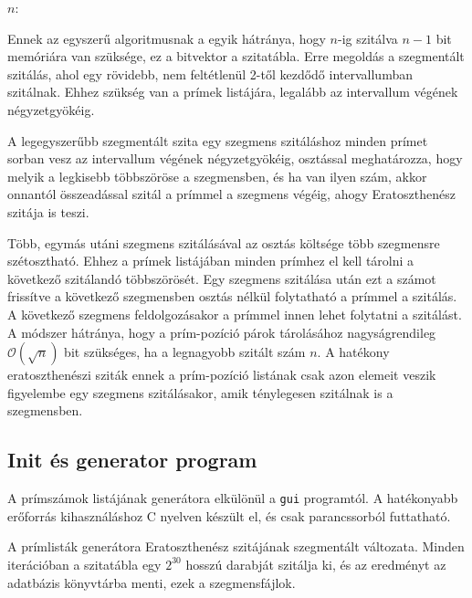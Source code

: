 \begin{algorithmic}[1]
\State $n$: 
\State {}
			\State {}
		\EndFor
	\EndIf
\EndFor
\end{algorithmic}

Ennek az egyszerű algoritmusnak a egyik hátránya, hogy $n$-ig szitálva $n-1$ bit memóriára van szüksége, ez a bitvektor a szitatábla.
Erre megoldás a szegmentált szitálás, ahol egy rövidebb, nem feltétlenül 2-től kezdődő intervallumban szitálnak.
Ehhez szükség van a prímek listájára, legalább az intervallum végének négyzetgyökéig.

A legegyszerűbb szegmentált szita egy szegmens szitáláshoz minden prímet sorban vesz az intervallum végének négyzetgyökéig, osztással meghatározza, hogy melyik a legkisebb többszöröse a szegmensben, és ha van ilyen szám, akkor onnantól összeadással szitál a prímmel a szegmens végéig, ahogy Eratoszthenész szitája is teszi.

Több, egymás utáni szegmens szitálásával az osztás költsége több szegmensre szétosztható.
Ehhez a prímek listájában minden prímhez el kell tárolni a következő szitálandó többszörösét.
Egy szegmens szitálása után ezt a számot frissítve a következő szegmensben osztás nélkül folytatható a prímmel a szitálás.
A következő szegmens feldolgozásakor a prímmel innen lehet folytatni a szitálást.
A módszer hátránya, hogy a prím-pozíció párok tárolásához nagyságrendileg $\mathcal{O}(\sqrt{n})$ bit szükséges, ha a legnagyobb szitált szám $n$.
A hatékony eratoszthenészi sziták ennek a prím-pozíció listának csak azon elemeit veszik figyelembe egy szegmens szitálásakor, amik ténylegesen szitálnak is a szegmensben.

\subsection{Init és generator program}

A prímszámok listájának generátora elkülönül a \texttt{gui} programtól.
A hatékonyabb erőforrás kihasználáshoz C nyelven készült el, és csak parancssorból futtatható.

A prímlisták generátora Eratoszthenész szitájának szegmentált változata.
Minden iterációban a szitatábla egy $2^{30}$ hosszú darabját szitálja ki,
és az eredményt az adatbázis könyvtárba menti, ezek a szegmensfájlok.

